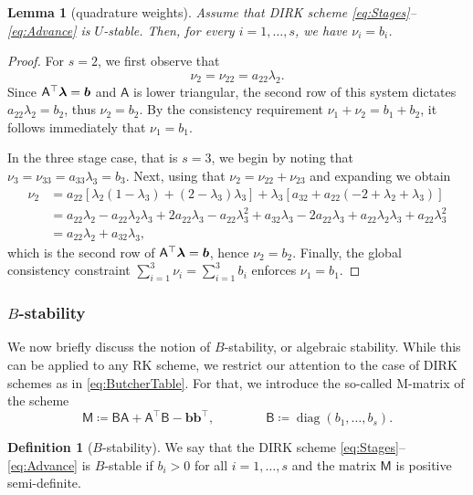 \documentclass{amsart}
\DeclareMathOperator*{\diag}{diag}
\newcommand{\bflambda}{\mbox{\boldmath$\lambda$}}
\newcommand{\msfA}{\mathsf{A}}
\newcommand{\msfB}{\mathsf{B}}
\newcommand{\msfM}{\mathsf{M}}
\newcommand{\bfb}{\boldsymbol{b}}
\newtheorem{lemma}{Lemma}[section]
\theoremstyle{definition}
\newtheorem{definition}{Definition}[section]
\begin{document}
\begin{lemma}[quadrature weights]
  Assume that DIRK scheme \eqref{eq:Stages}--\eqref{eq:Advance} is $U$-stable. Then, for every $i = 1,\ldots, s$, we have $\nu_i = b_i$.
\end{lemma}
\begin{proof}
  For $s=2$, we first observe that
  \[
    \nu_2 = \nu_{22} = a_{22}\lambda_2.
  \]
  Since $\msfA^\top \bflambda = \bfb$ and $\msfA$ is lower triangular, the second row of this system dictates $a_{22}\lambda_2 = b_2$, thus $\nu_2 = b_2$. By the consistency requirement $\nu_1 + \nu_2 = b_1 + b_2$, it follows immediately that $\nu_1 = b_1$.

  In the three stage case, that is $s=3$,  we begin by noting that $\nu_3 = \nu_{33} = a_{33}\lambda_3 = b_3$. Next, using that $\nu_2 = \nu_{22} + \nu_{23}$ and expanding we obtain
  \begin{align*}
    \nu_2 &= a_{22}[\lambda_2(1-\lambda_3) + (2-\lambda_3)\lambda_3] + \lambda_3[a_{32} + a_{22}(-2+\lambda_2+\lambda_3)]
    \\
    &= a_{22}\lambda_2 - a_{22}\lambda_2\lambda_3 + 2a_{22}\lambda_3 - a_{22}\lambda_3^2 + a_{32}\lambda_3 - 2a_{22}\lambda_3 + a_{22}\lambda_2\lambda_3 + a_{22}\lambda_3^2
    \\
    &= a_{22}\lambda_2 + a_{32}\lambda_3,
  \end{align*}
  which is the second row of $\msfA^\top \bflambda = \bfb$, hence $\nu_2 = b_2$. Finally, the global consistency constraint $\sum_{i=1}^3 \nu_i = \sum_{i=1}^3 b_i$ enforces $\nu_1 = b_1$.
\end{proof}

\subsubsection{$B$-stability}

We now briefly discuss the notion of $B$-stability, or algebraic stability. While this can be applied to any RK scheme, we restrict our attention to the case of DIRK schemes as in \eqref{eq:ButcherTable}. For that, we introduce the so-called M-matrix of the scheme
\begin{equation}
\label{eq:MMatrixBstab}
  \msfM \coloneqq \msfB \msfA + \msfA^\top \msfB - \bfb\bfb^\top, \qquad \qquad \msfB \coloneqq \diag(b_1, \ldots, b_s).
\end{equation}

\begin{definition}[$B$-stability]
\label{def:Bstability}
  We say that the DIRK scheme \eqref{eq:Stages}--\eqref{eq:Advance} is $B$-stable if $b_i>0$ for all $i=1,\ldots, s$ and the matrix $\msfM$ is positive semi-definite.
\end{definition}
\end{document}

